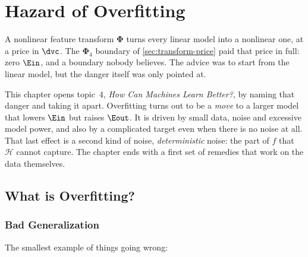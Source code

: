 \chapter{Hazard of Overfitting}

\begin{prev}
    A nonlinear feature transform \(\bm{\Phi}\) turns every linear model into a
    nonlinear one, at a price in \(\dvc\). The \(\bm{\Phi}_4\) boundary of
    \autoref{sec:transform-price} paid that price in full: zero \(\Ein\), and a
    boundary nobody believes. The advice was to start from the linear model,
    but the danger itself was only pointed at.
\end{prev}

This chapter opens topic~4, \emph{How Can Machines Learn Better?}, by naming
that danger and taking it apart. Overfitting turns out to be a \emph{move} to a
larger model that lowers \(\Ein\) but raises \(\Eout\). It is driven by small
data, noise and excessive model power, and also by a complicated target even
when there is no noise at all. That last effect is a second kind of noise,
\emph{deterministic} noise: the part of \(f\) that \(\mathcal{H}\) cannot
capture. The chapter ends with a first set of remedies that work on the data
themselves.

\section{What is Overfitting?}\label{sec:what-overfit}


\subsection{Bad Generalization}

The smallest example of things going wrong:

\begin{center}
\end{center}

